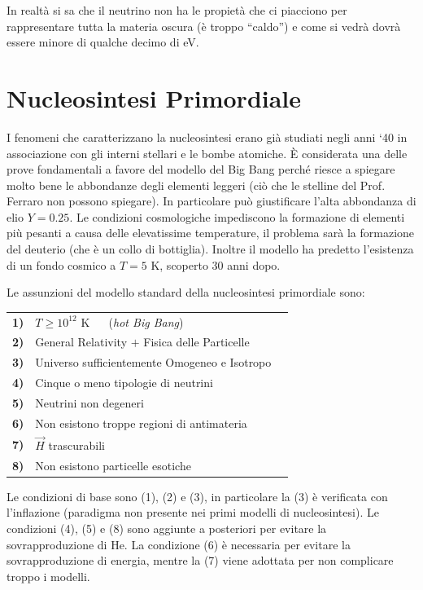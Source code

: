 In realtà si sa che il neutrino non ha le propietà che ci piacciono per rappresentare tutta la materia oscura (è troppo ``caldo'') e come si vedrà dovrà essere minore di qualche decimo di eV. 


\section{Nucleosintesi Primordiale}
I fenomeni che caratterizzano la nucleosintesi erano già studiati negli anni `40 in associazione con gli interni stellari e le bombe atomiche. È considerata una delle prove fondamentali a favore del modello del Big Bang perché riesce a spiegare molto bene le abbondanze degli elementi leggeri (ciò che le stelline del Prof. Ferraro non possono spiegare). In particolare può giustificare l'alta abbondanza di elio $Y=0.25$. Le condizioni cosmologiche impediscono la formazione di elementi più pesanti a causa delle elevatissime temperature, il problema sarà la formazione del deuterio (che è un collo di bottiglia). Inoltre il modello ha predetto l'esistenza di un fondo cosmico a $T=5$ K, scoperto 30 anni dopo. 

\vspace{1em}
\noindent Le assunzioni del modello standard della nucleosintesi primordiale sono:


\begin{table}[ht]
    \def\arraystretch{1.5}
    \begin{tabular}{lll}

    \textbf{1)} & $T\ge 10^{12}$ K $\quad$  (\textit{hot Big Bang}) \\
    \textbf{2)} & General Relativity $+$ Fisica delle Particelle \\
    \textbf{3)} & Universo sufficientemente Omogeneo e Isotropo  \\
    \textbf{4)} & Cinque o meno tipologie di neutrini \\
    \textbf{5)} & Neutrini non degeneri \\
    \textbf{6)} & Non esistono troppe regioni di antimateria \\
    \textbf{7)} & $\vec{H}$ trascurabili  \\
    \textbf{8)} & Non esistono particelle esotiche \\
    \end{tabular}
    \end{table}

Le condizioni di base sono (1), (2) e (3), in particolare la (3) è verificata con l'inflazione (paradigma non presente nei primi modelli di nucleosintesi). Le condizioni (4), (5) e (8) sono aggiunte a posteriori per evitare la sovrapproduzione di He. La condizione (6) è necessaria per evitare la sovrapproduzione di energia, mentre la (7) viene adottata per non complicare troppo i modelli.  

